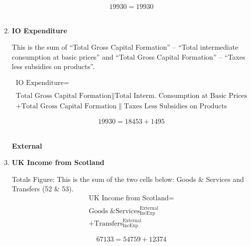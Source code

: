 \begin{enumerate}
\begin{equation} \nonumber
19930 = 19930
\end{equation}\\


\item \textbf {IO Expenditure}

This is the sum of ``Total Gross Capital Formation'' – ``Total intermediate consumption at basic prices'' and ``Total Gross Capital Formation'' – ``Taxes less subsidies on products''. \cite{ScotGov2013a}

\begin{equation}
\begin{split}
\text{IO Expenditure} =  \\ \\
\text{Total Gross Capital Formation}\|\text{Total Interm. Consumption at Basic Prices}\\
+\text{Total Gross Capital Formation}\|\text{Taxes Less Subsidies on Products}
\end{split} \label{eq:2.5.54}
\end{equation}

\begin{equation} \nonumber
19930 = 18453+1495
\end{equation}\\



\pagebreak


\begin{center}
\textbf{\LARGE External}
\end{center}

\item \textbf {UK Income from Scotland}

Totals Figure: This is the sum of the two cells below: Goods \& Services and Transfers (52 \& 53).\\

\begin{equation}
\begin{split}
\text{UK Income from Scotland} =  \\ \\
\text{Goods \& Services}^\text{External}_\text{IncExp}\\
+\text{Transfers}^\text{External}_\text{IncExp}
\end{split} \label{eq:2.5.55}
\end{equation}

\begin{equation} \nonumber
67133 = 54759+12374
\end{equation}\\



\end{enumerate}
